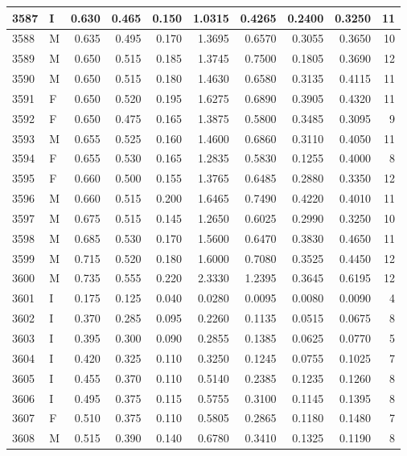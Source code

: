 \documentclass[9pt,twocolumn,twoside,]{pnas-new}
\begin{document}
\begin{tabular}{l|l|r|r|r|r|r|r|r|r}
\hline
3587 & I & 0.630 & 0.465 & 0.150 & 1.0315 & 0.4265 & 0.2400 & 0.3250 & 11\\
\hline
3588 & M & 0.635 & 0.495 & 0.170 & 1.3695 & 0.6570 & 0.3055 & 0.3650 & 10\\
\hline
3589 & M & 0.650 & 0.515 & 0.185 & 1.3745 & 0.7500 & 0.1805 & 0.3690 & 12\\
\hline
3590 & M & 0.650 & 0.515 & 0.180 & 1.4630 & 0.6580 & 0.3135 & 0.4115 & 11\\
\hline
3591 & F & 0.650 & 0.520 & 0.195 & 1.6275 & 0.6890 & 0.3905 & 0.4320 & 11\\
\hline
3592 & F & 0.650 & 0.475 & 0.165 & 1.3875 & 0.5800 & 0.3485 & 0.3095 & 9\\
\hline
3593 & M & 0.655 & 0.525 & 0.160 & 1.4600 & 0.6860 & 0.3110 & 0.4050 & 11\\
\hline
3594 & F & 0.655 & 0.530 & 0.165 & 1.2835 & 0.5830 & 0.1255 & 0.4000 & 8\\
\hline
3595 & F & 0.660 & 0.500 & 0.155 & 1.3765 & 0.6485 & 0.2880 & 0.3350 & 12\\
\hline
3596 & M & 0.660 & 0.515 & 0.200 & 1.6465 & 0.7490 & 0.4220 & 0.4010 & 11\\
\hline
3597 & M & 0.675 & 0.515 & 0.145 & 1.2650 & 0.6025 & 0.2990 & 0.3250 & 10\\
\hline
3598 & M & 0.685 & 0.530 & 0.170 & 1.5600 & 0.6470 & 0.3830 & 0.4650 & 11\\
\hline
3599 & M & 0.715 & 0.520 & 0.180 & 1.6000 & 0.7080 & 0.3525 & 0.4450 & 12\\
\hline
3600 & M & 0.735 & 0.555 & 0.220 & 2.3330 & 1.2395 & 0.3645 & 0.6195 & 12\\
\hline
3601 & I & 0.175 & 0.125 & 0.040 & 0.0280 & 0.0095 & 0.0080 & 0.0090 & 4\\
\hline
3602 & I & 0.370 & 0.285 & 0.095 & 0.2260 & 0.1135 & 0.0515 & 0.0675 & 8\\
\hline
3603 & I & 0.395 & 0.300 & 0.090 & 0.2855 & 0.1385 & 0.0625 & 0.0770 & 5\\
\hline
3604 & I & 0.420 & 0.325 & 0.110 & 0.3250 & 0.1245 & 0.0755 & 0.1025 & 7\\
\hline
3605 & I & 0.455 & 0.370 & 0.110 & 0.5140 & 0.2385 & 0.1235 & 0.1260 & 8\\
\hline
3606 & I & 0.495 & 0.375 & 0.115 & 0.5755 & 0.3100 & 0.1145 & 0.1395 & 8\\
\hline
3607 & F & 0.510 & 0.375 & 0.110 & 0.5805 & 0.2865 & 0.1180 & 0.1480 & 7\\
\hline
3608 & M & 0.515 & 0.390 & 0.140 & 0.6780 & 0.3410 & 0.1325 & 0.1190 & 8\\

\end{tabular}
\end{document}
